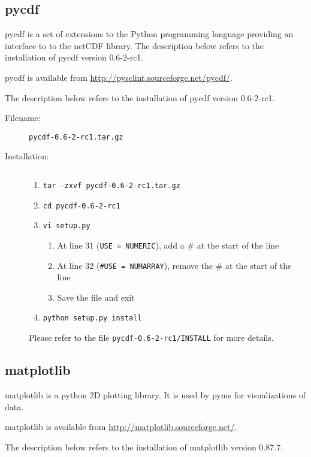 \subsection{pycdf}

pycdf is a set of extensions to the Python programming language
providing an interface to to the netCDF library. The description
below refers to the installation of pycdf version 0.6-2-rc1.

pycdf is available from \url{http://pysclint.sourceforge.net/pycdf/}.

The description below refers to the installation of pycdf version
0.6-2-rc1.

\begin{description}
\item [Filename:] {\tt pycdf-0.6-2-rc1.tar.gz}
\item [Installation:] $ $
  \begin{enumerate}
  \item {\tt tar -zxvf pycdf-0.6-2-rc1.tar.gz}
  \item {\tt cd pycdf-0.6-2-rc1}
  \item {\tt vi setup.py}
    \begin{enumerate}
    \item At line 31 ({\tt USE = NUMERIC}), add a \# at the start of the line
    \item At line 32 ({\tt \#USE = NUMARRAY}), remove the \# at the start
    of the line
    \item Save the file and exit
    \end{enumerate}
  \item {\tt python setup.py install}
  \end{enumerate}
Please refer to the file {\tt pycdf-0.6-2-rc1/INSTALL} for more details.
\end{description}

\subsection{matplotlib}

matplotlib is a python 2D plotting library.  It is used by pyms for 
visualizations of data.

matplotlib is available from \url{http://matplotlib.sourceforge.net/}.

The description below refers to the installation of matplotlib version
0.87.7.

